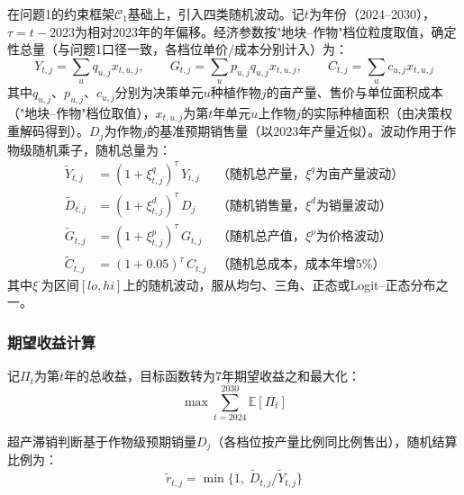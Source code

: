 \documentclass[12pt,a4paper]{article}
\begin{document}
在问题1的约束框架$\mathcal{C}_1$基础上，引入四类随机波动。记$t$为年份（2024--2030），$\tau=t-2023$为相对2023年的年偏移。经济参数按"地块--作物"档位粒度取值，确定性总量（与问题1口径一致，各档位单价/成本分别计入）为：
\begin{equation}
Y_{t,j}=\sum_{u}q_{u,j}x_{t,u,j},\qquad
G_{t,j}=\sum_{u}p_{u,j}q_{u,j}x_{t,u,j},\qquad
C_{t,j}=\sum_{u}c_{u,j}x_{t,u,j}
\label{eq:det}
\end{equation}
其中$q_{u,j}$、$p_{u,j}$、$c_{u,j}$分别为决策单元$u$种植作物$j$的亩产量、售价与单位面积成本（"地块--作物"档位取值），$x_{t,u,j}$为第$t$年单元$u$上作物$j$的实际种植面积（由决策权重解码得到）。$D_j$为作物$j$的基准预期销售量（以2023年产量近似）。波动作用于作物级随机乘子，随机总量为：
\begin{align}
\tilde Y_{t,j}&=(1+\xi^q_{t,j})^{\tau}\,Y_{t,j} & \text{（随机总产量，$\xi^q$为亩产量波动）} \label{eq:yrand} \\
\tilde D_{t,j}&=(1+\xi^d_{t,j})^{\tau}\,D_j & \text{（随机销售量，$\xi^d$为销量波动）} \label{eq:sales} \\
\tilde G_{t,j}&=(1+\xi^p_{t,j})^{\tau}\,G_{t,j} & \text{（随机总产值，$\xi^p$为价格波动）} \label{eq:price} \\
\tilde C_{t,j}&=(1+0.05)^{\tau}\,C_{t,j} & \text{（随机总成本，成本年增5\%）} \label{eq:cost}
\end{align}
其中$\xi^{\cdot}$为区间$[lo,hi]$上的随机波动，服从均匀、三角、正态或Logit--正态分布之一。

\subsubsection{期望收益计算}

记$\Pi_t$为第$t$年的总收益，目标函数转为7年期望收益之和最大化：
\begin{equation}
\max\sum_{t=2024}^{2030}\mathbb{E}[\Pi_t]
\label{eq:obj2}
\end{equation}

超产滞销判断基于作物级预期销量$D_j$（各档位按产量比例同比例售出），随机结算比例为：
\begin{equation}
\tilde r_{t,j}=\min\Big\{1,\;\tilde D_{t,j}/\tilde Y_{t,j}\Big\} \label{eq:ratio}
\end{equation}
\end{document}
